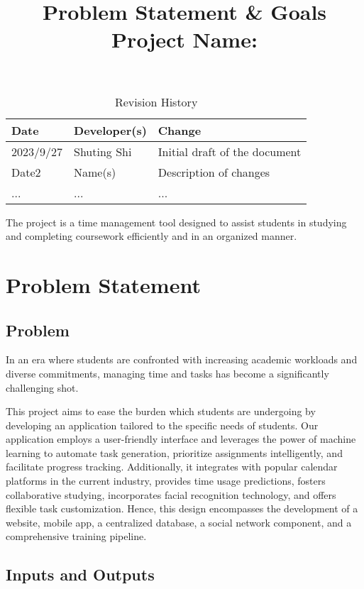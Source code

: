 \documentclass{article}
\title{\textbf{Problem Statement \& Goals}\\\textbf{Project Name: \progname}}
\author{\authname}
\date{}
\begin{document}
\maketitle

\begin{table}[hp]
\caption{Revision History} \label{TblRevisionHistory}
\begin{tabularx}{\textwidth}{llX}
\toprule
\textbf{Date} & \textbf{Developer(s)} & \textbf{Change}\\
\midrule
2023/9/27 & Shuting Shi  &  Initial draft of the document\\
Date2 & Name(s) & Description of changes\\
... & ... & ...\\
\bottomrule
\end{tabularx}
\end{table}

The project is a time management tool designed to assist students in studying and completing coursework efficiently and in an organized manner.

\section{Problem Statement}

\subsection{Problem}

    In an era where students are confronted with increasing academic workloads and diverse commitments, managing time and tasks has become a significantly challenging shot.

    This project aims to ease the burden which students are undergoing by developing an application tailored to the specific needs of students. Our application employs a user-friendly interface and leverages the power of machine learning to automate task generation, prioritize assignments intelligently, and facilitate progress tracking. Additionally, it integrates with popular calendar platforms in the current industry, provides time usage predictions, fosters collaborative studying, incorporates facial recognition technology, and offers flexible task customization. Hence, this design encompasses the development of a website, mobile app, a centralized database, a social network component, and a comprehensive training pipeline.
\subsection{Inputs and Outputs}
\end{document}
